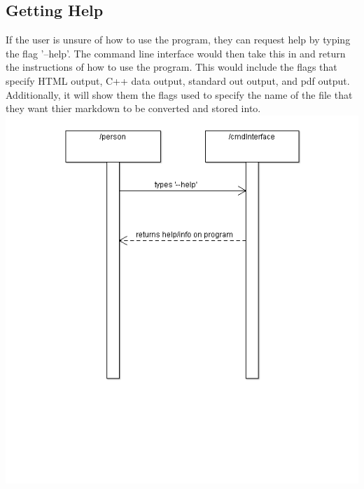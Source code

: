 \subsection{Getting Help}
If the user is unsure of how to use the program, they can request help by typing the flag '--help'. The command line interface would then take this in and return the instructions of how to use the program. This would include the flags that specify HTML output, C++ data output, standard out output, and pdf output. Additionally, it will show them the flags used to specify the name of the file that they want thier markdown to be converted and stored into. 
\hspace{-2cm}\includegraphics[width=450pt]{images/GettingHelp.png}

